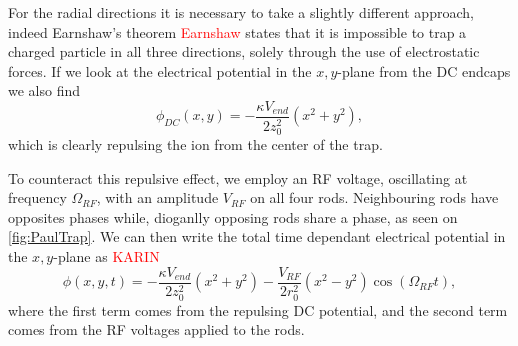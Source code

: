 For the radial directions it is necessary to take a slightly different approach, indeed Earnshaw's theorem \textcolor{red}{Earnshaw} states
that it is impossible to trap a charged particle in all three directions, solely through the use of electrostatic forces. If we look at the electrical potential in the $x,y$-plane from the DC endcaps we also find
\begin{equation}
    \phi_{DC}(x,y) = -\frac{\kappa V_{end}}{2z_0^2}(x^2+y^2),
\end{equation}
which is clearly repulsing the ion from the center of the trap.

To counteract this repulsive effect, we employ an RF voltage, oscillating at frequency $\Omega_{RF}$, with an amplitude $V_{RF}$ on all four rods. Neighbouring rods have opposites phases while, dioganlly opposing rods share a phase, as seen on \cref{fig:PaulTrap}.
We can then write the total time dependant electrical potential in the $x,y$-plane as \textcolor{red}{KARIN}
\begin{equation}
    \phi(x,y,t) = -\frac{\kappa V_{end}}{2z_0^2}(x^2+y^2)-\frac{V_{RF}}{2r_0^2}(x^2-y^2)\cos{(\Omega_{RF}t)},
\end{equation}
where the first term comes from the repulsing DC potential, and the second term comes from the RF voltages applied to the rods.

